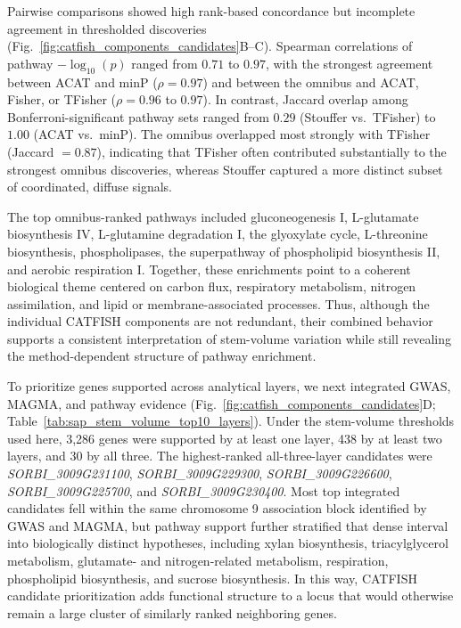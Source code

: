 \documentclass[unnumsec,webpdf,contemporary,large]{oup-authoring-template}%
\theoremstyle{thmstyleone}%
\theoremstyle{thmstyletwo}%
\theoremstyle{thmstylethree}%
\begin{document}
Pairwise comparisons showed high rank-based concordance but incomplete agreement in thresholded discoveries (Fig.~\ref{fig:catfish_components_candidates}B--C). Spearman correlations of pathway \(-\log_{10}(p)\) ranged from \(0.71\) to \(0.97\), with the strongest agreement between ACAT and minP (\(\rho = 0.97\)) and between the omnibus and ACAT, Fisher, or TFisher (\(\rho = 0.96\) to \(0.97\)). In contrast, Jaccard overlap among Bonferroni-significant pathway sets ranged from \(0.29\) (Stouffer vs.\ TFisher) to \(1.00\) (ACAT vs.\ minP). The omnibus overlapped most strongly with TFisher (Jaccard \(= 0.87\)), indicating that TFisher often contributed substantially to the strongest omnibus discoveries, whereas Stouffer captured a more distinct subset of coordinated, diffuse signals.

The top omnibus-ranked pathways included gluconeogenesis I, L-glutamate biosynthesis IV, L-glutamine degradation I, the glyoxylate cycle, L-threonine biosynthesis, phospholipases, the superpathway of phospholipid biosynthesis II, and aerobic respiration I. Together, these enrichments point to a coherent biological theme centered on carbon flux, respiratory metabolism, nitrogen assimilation, and lipid or membrane-associated processes. Thus, although the individual CATFISH components are not redundant, their combined behavior supports a consistent interpretation of stem-volume variation while still revealing the method-dependent structure of pathway enrichment.

To prioritize genes supported across analytical layers, we next integrated GWAS, MAGMA, and pathway evidence (Fig.~\ref{fig:catfish_components_candidates}D; Table~\ref{tab:sap_stem_volume_top10_layers}). Under the stem-volume thresholds used here, 3,286 genes were supported by at least one layer, 438 by at least two layers, and 30 by all three. The highest-ranked all-three-layer candidates were \textit{SORBI\_3009G231100}, \textit{SORBI\_3009G229300}, \textit{SORBI\_3009G226600}, \textit{SORBI\_3009G225700}, and \textit{SORBI\_3009G230400}. Most top integrated candidates fell within the same chromosome 9 association block identified by GWAS and MAGMA, but pathway support further stratified that dense interval into biologically distinct hypotheses, including xylan biosynthesis, triacylglycerol metabolism, glutamate- and nitrogen-related metabolism, respiration, phospholipid biosynthesis, and sucrose biosynthesis. In this way, CATFISH candidate prioritization adds functional structure to a locus that would otherwise remain a large cluster of similarly ranked neighboring genes.
\end{document}
